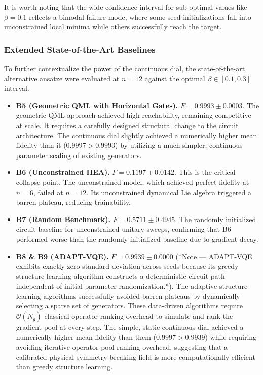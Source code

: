 \documentclass[pdflatex,sn-mathphys-num]{sn-jnl}
\theoremstyle{thmstyleone}
\theoremstyle{thmstyletwo}
\theoremstyle{thmstylethree}
\begin{document}
It is worth noting that the wide confidence interval for sub-optimal values like $\beta=0.1$ reflects a bimodal failure mode, where some seed initializations fall into unconstrained local minima while others successfully reach the target.

\subsubsection{Extended State-of-the-Art Baselines}
To further contextualize the power of the continuous dial, the state-of-the-art alternative ans\"atze were evaluated at $n=12$ against the optimal $\beta \in [0.1, 0.3]$ interval.
\begin{itemize}
    \item \textbf{B5 (Geometric QML with Horizontal Gates).} $F=0.9993 \pm 0.0003$. The geometric QML approach achieved high reachability, remaining competitive at scale. It requires a carefully designed structural change to the circuit architecture. The continuous dial slightly achieved a numerically higher mean fidelity than it ($0.9997 > 0.9993$) by utilizing a much simpler, continuous parameter scaling of existing generators.
    \item \textbf{B6 (Unconstrained HEA).} $F=0.1197 \pm 0.0142$. This is the critical collapse point. The unconstrained model, which achieved perfect fidelity at $n=6$, failed at $n=12$. Its unconstrained dynamical Lie algebra triggered a barren plateau, reducing trainability.
    \item \textbf{B7 (Random Benchmark).} $F=0.5711 \pm 0.4945$. The randomly initialized circuit baseline for unconstrained unitary sweeps, confirming that B6 performed worse than the randomly initialized baseline due to gradient decay.
    \item \textbf{B8 \& B9 (ADAPT-VQE).} $F=0.9939 \pm 0.0000$ (*Note --- ADAPT-VQE exhibits exactly zero standard deviation across seeds because its greedy structure-learning algorithm constructs a deterministic circuit path independent of initial parameter randomization.*). The adaptive structure-learning algorithms successfully avoided barren plateaus by dynamically selecting a sparse set of generators. These data-driven algorithms require $\mathcal{O}(N_g)$ classical operator-ranking overhead to simulate and rank the gradient pool at every step. The simple, static continuous dial achieved a numerically higher mean fidelity than them ($0.9997 > 0.9939$) while requiring avoiding iterative operator-pool ranking overhead, suggesting that a calibrated physical symmetry-breaking field is more computationally efficient than greedy structure learning.
\end{itemize}
\end{document}
